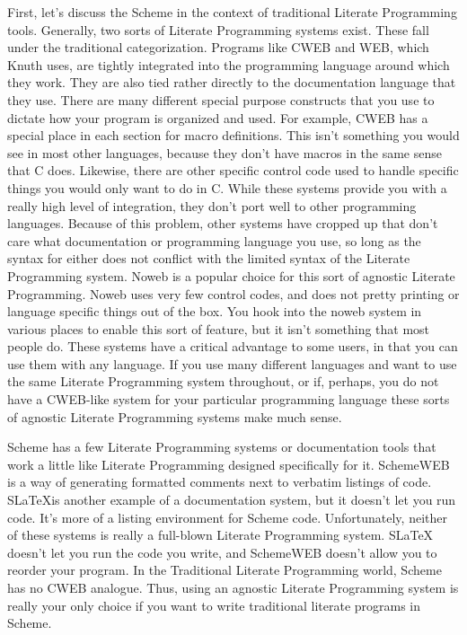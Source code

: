 %
First, let's discuss the Scheme in the context of traditional Literate
Programming tools. Generally, two sorts of Literate
Programming systems exist.  These fall under the traditional
categorization.
Programs like CWEB and WEB, which Knuth uses, are tightly integrated
into the programming language around which they work.  They are also
tied rather directly to the documentation language that they use.
There are many different special purpose constructs that you use to
dictate how your program is organized and used.  For example, CWEB has
a special place in each section for macro definitions.  This isn't
something you would see in most other languages, because they don't
have macros in the same sense that C does.  Likewise, there are other
specific control code used to handle specific things you would only
want to do in C. While these systems provide you with a really high
level of integration, they don't port well to other programming
languages.  Because of this problem, other systems have cropped up
that don't care what documentation or programming language you use, so
long as the syntax for either does not conflict with the limited
syntax of the Literate Programming system.  Noweb is a popular choice
for this sort of agnostic Literate Programming.  Noweb uses very few
control codes, and does not pretty printing or language specific
things out of the box.  You hook into the noweb system in various
places to enable this sort of feature, but it isn't something that
most people do.  These systems have a critical advantage to some
users, in that you can use them with any language.  If you use many
different languages and want to use the same Literate Programming
system throughout, or if, perhaps, you do not have a CWEB-like system
for your particular programming language these sorts of agnostic
Literate Programming systems make much sense.

Scheme has a few Literate Programming systems or documentation tools
that work a little like Literate Programming designed specifically for
it.  SchemeWEB is a way of generating formatted comments next to
verbatim listings of code.  S\LaTeX is another example of a
documentation system, but it doesn't let you run code.  It's more of a
listing environment for Scheme code.  Unfortunately, neither of these
systems is really a full-blown Literate Programming system.  SLaTeX
doesn't let you run the code you write, and SchemeWEB doesn't allow
you to reorder your program.  In the Traditional Literate Programming
world, Scheme has no CWEB analogue.  Thus, using an agnostic Literate
Programming system is really your only choice if you want to write
traditional literate programs in Scheme.

